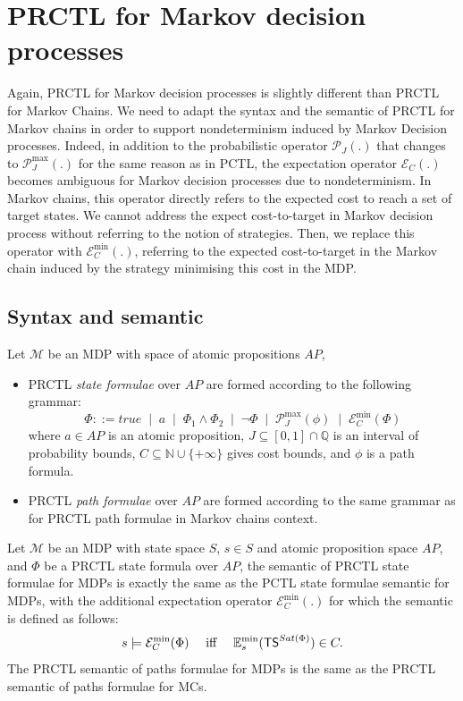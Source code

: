 \section{PRCTL for Markov decision processes}\label{PRCTL-MDP}
Again, PRCTL for Markov decision processes is slightly different than PRCTL for Markov Chains.
We need to adapt the syntax and the semantic of PRCTL for Markov chains in order to support nondeterminism induced by Markov Decision processes.
Indeed, in addition to the probabilistic operator $\mathcal{P}_J(.)$ that changes to $\mathcal{P}_J^{\max}(.)$ for the same reason as in PCTL,
the expectation operator $\mathcal{E}_C(.)$ becomes ambiguous for Markov decision processes due to nondeterminism.
In Markov chains, this operator directly refers to the expected cost to reach a set of target states.
We cannot address the expect cost-to-target in Markov decision process without referring to the notion of strategies.
Then, we replace this operator with $\mathcal{E}^{\min}_C(.)$, referring to the expected cost-to-target in the Markov chain induced by the strategy minimising this cost in the MDP.

\subsection*{Syntax and semantic}

\begin{definition}
Let $\mathcal{M}$ be an MDP with space of atomic propositions $AP$,
\begin{itemize}
  \item PRCTL \textit{state formulae} over $AP$ are formed according to the following grammar:
  \[
    \Phi ::= true \;\; | \;\; a \;\; | \;\; \Phi_1 \wedge \Phi_2 \;\; | \;\; \neg \Phi \;\; | \;\; \mathcal{P}^{\max}_J(\phi) \;\; | \;\; \mathcal{E}^{\min}_C(\Phi)
  \]
  where $a \in AP$ is an atomic proposition, $J \subseteq [0, 1] \cap \mathbb{Q}$ is an interval of probability bounds, $C \subseteq \mathbb{N} \cup \{+\infty\}$ gives cost bounds, and $\phi$ is a path formula.
  \item PRCTL \textit{path formulae} over $AP$ are formed according to the same grammar as for PRCTL path formulae in Markov chains context.
\end{itemize}
\end{definition}
\begin{definition}
  Let $\mathcal{M}$ be an MDP with state space $S$, $s \in S$ and atomic proposition space $AP$, and $\Phi$ be a PRCTL state formula over $AP$,
  the semantic of PRCTL state formulae for MDPs is exactly the same as the PCTL state formulae semantic for MDPs, with the additional expectation operator $\mathcal{E}^{\min}_C(.)$ for which the semantic is defined as follows:
  \[
  s \models \mathcal{E}^{\min}_C(\Phi) \quad \text{ iff }\quad \mathbb{E}^{\min}_s(\text{\sffamily TS}^{Sat(\Phi)}) \in C.
  \]
  The PRCTL semantic of paths formulae for MDPs is the same as the PRCTL semantic of paths formulae for MCs.
\end{definition}

